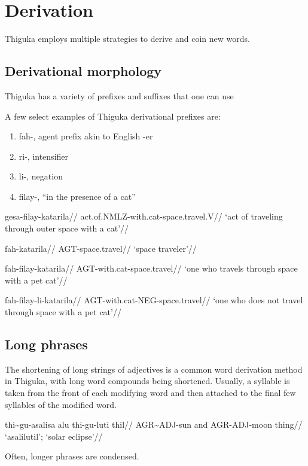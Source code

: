 \section{Derivation}
Thiguka employs multiple strategies to derive and coin new words.

\subsection{Derivational morphology}
Thiguka has a variety of prefixes and suffixes that one can use 

A few select examples of Thiguka derivational prefixes are:

\begin{enumerate}
    \item fah-, agent prefix akin to English -er
    \item ri-, intensifier
    \item li-, negation
    \item filay-, ``in the presence of a cat''
\end{enumerate}

\ex
\begingl
\gla  gesa-filay-katarila//
\glb  act.of.NMLZ-with.cat-space.travel.V//
\glft `act of traveling through outer space with a cat'//
\endgl
\xe

\ex
\begingl
\gla  fah-katarila//
\glb  AGT-space.travel//
\glft `space traveler'//
\endgl
\xe

\ex
\begingl
\gla  fah-filay-katarila//
\glb  AGT-with.cat-space.travel//
\glft `one who travels through space with a pet cat'//
\endgl
\xe

\ex
\begingl
\gla  fah-filay-li-katarila//
\glb  AGT-with.cat-NEG-space.travel//
\glft `one who does not travel through space with a pet cat'//
\endgl
\xe

\subsection{Long phrases}
The shortening of long strings of adjectives is a common word derivation method in Thiguka, with long word compounds being shortened.
Usually, a syllable is taken from the front of each modifying word and then attached to the final few syllables of the modified word.

\ex
\begingl
\gla   thi\~{}gu-asalisa alu thi-gu-luti thil//
\glb   AGR\~{}ADJ-sun and AGR-ADJ-moon thing//
\glft  `asalilutil'; `solar eclipse'//
\endgl
\xe

Often, longer phrases are condensed.

